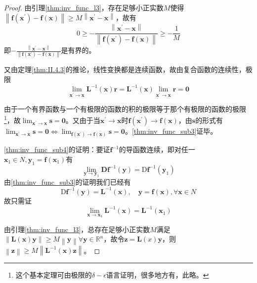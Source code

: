 \documentclass[../main.tex]{subfiles}
\begin{document}
\begin{proof}
    由引理\ref{thm:inv_func_l3}，存在足够小正实数$M$使得$\left\|\mathbf{f}\left(\mathbf{x}^\prime\right)-\mathbf{f}\left(\mathbf{x}\right)\right\|\geq M\left\|\mathbf{x}^\prime-\mathbf{x}\right\|$，故有
    \[0\geq-\frac{\left\|\mathbf{x}^\prime-\mathbf{x}\right\|}{\left\|\mathbf{f}\left(\mathbf{x}^\prime\right)-\mathbf{f}\left(\mathbf{x}\right)\right\|}\geq-\frac{1}{M}\]
    即$-\frac{\left\|\mathbf{x}^\prime-\mathbf{x}\right\|}{\left\|\mathbf{f}\left(\mathbf{x}^\prime\right)-\mathbf{f}\left(\mathbf{x}\right)\right\|}$是有界的。

    又由定理\ref{thm:II.4.3}的推论，线性变换都是连续函数，故由复合函数的连续性，极限
    \[\lim_{\mathbf{x}^\prime\to\mathbf{x}}\mathbf{L}^{-1}\left(\mathbf{x}\right)\mathbf{r}=\mathbf{L}^{-1}\left(\mathbf{x}\right)\lim_{\mathbf{x}^\prime\to\mathbf{x}}\mathbf{r}=\mathbf{0}\]

    由于一个有界函数与一个有极限的函数的积的极限等于那个有极限的函数的极限\footnote{这个基本定理可由极限的$\delta-\epsilon$语言证明，很多地方有，此略。}，故$\lim_{\mathbf{x}^\prime\to\mathbf{x}}\mathbf{s}=\mathbf{0}$。又由于当$\mathbf{x}^\prime\to\mathbf{x}$时$\mathbf{f}\left(\mathbf{x}^\prime\right)\to\mathbf{f}\left(\mathbf{x}\right)$，由$\mathbf{s}$的形式有$\lim_{\mathbf{x}^\prime\to\mathbf{x}}\mathbf{s}=\mathbf{0}\Leftrightarrow\lim_{\mathbf{f}\left(\mathbf{x}^\prime\right)\to\mathbf{f}\left(\mathbf{x}\right)}\mathbf{s}=\mathbf{0}$。\ref{thm:inv_func_sub3}证毕。

    \ref{thm:inv_func_sub4}的证明：要证$\mathbf{f}^{-1}$的导函数连续，即对任一$\mathbf{x}_1\in N, \mathbf{y}_1=\mathbf{f}\left(\mathbf{x}_1\right)$有
    \[\lim_{\mathbf{y}\to\mathbf{y}_1}\mathbf{D}\mathbf{f}^{-1}\left(\mathbf{y}\right)=\mathrm{D}\mathbf{f}^{-1}\left(\mathbf{y}_1\right)\]
    由\ref{thm:inv_func_sub3}的证明我们已经有
    \[
        \mathrm{D}\mathbf{f}^{-1}\left(\mathbf{y}\right)=\mathbf{L}^{-1}\left(\mathbf{x}\right),\quad \mathbf{y}=\mathbf{f}\left(\mathbf{x}\right),\forall\mathbf{x}\in N\]
    故只需证
    \[\lim_{\mathbf{x}\to\mathbf{x}_1}\mathbf{L}^{-1}\left(\mathbf{x}\right)=\mathbf{L}^{-1}\left(\mathbf{x}_1\right)\]

    由引理\ref{thm:inv_func_l3}，总存在足够小正实数$M$满足$\left\|\mathbf{L}\left(\mathbf{x}\right)\mathbf{y}\right\|\geq M\left\|\mathbf{y}\right\|\forall\mathbf{y}\in\mathbb{R}^n$，故令$\mathbf{z}=\mathbf{L}\left(x\right)\mathbf{y}$，则$\left\|\mathbf{z}\right\|\geq M\left\|\mathbf{L}^{-1}\left(\mathbf{x}\right)\mathbf{z}\right\|$。


\end{proof}
\end{document}
